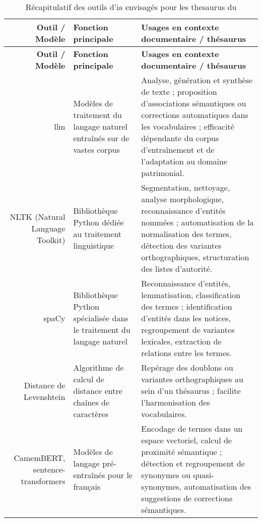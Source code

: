 \begin{longtable}{D E E}
	\caption{Récapitulatif des outils d'\ac{ia} envisagés pour les \gls{thesaurus} du \mae}
	\label{tab:recapIA}\\
	\hline\hline
	\textbf{Outil / Modèle} & \textbf{Fonction principale} & \textbf{Usages en contexte documentaire / thésaurus} \\
	\hline
	\endfirsthead
	
	\hline\hline
	\textbf{Outil / Modèle} & \textbf{Fonction principale} & \textbf{Usages en contexte documentaire / thésaurus} \\
	\hline
	\endhead
	
	\hline
	\endfoot
	
	\hline\hline
	\endlastfoot
	
	\ac{llm} & Modèles de traitement du langage naturel entraînés sur de vastes corpus & Analyse, génération et synthèse de texte ; proposition d’associations sémantiques ou corrections automatiques dans les vocabulaires ; efficacité dépendante du corpus d’entraînement et de l’adaptation au domaine patrimonial. \\
	NLTK (Natural Language Toolkit) & Bibliothèque Python dédiée au traitement linguistique & Segmentation, nettoyage, analyse morphologique, reconnaissance d’entités nommées ; automatisation de la normalisation des termes, détection des variantes orthographiques, structuration des listes d’autorité. \\
	spaCy & Bibliothèque Python spécialisée dans le traitement du langage naturel & Reconnaissance d’entités, lemmatisation, classification des termes ; identification d’entités dans les notices, regroupement de variantes lexicales, extraction de relations entre les termes. \\
	Distance de Levenshtein & Algorithme de calcul de distance entre chaînes de caractères & Repérage des doublons ou variantes orthographiques au sein d’un thésaurus ; facilite l’harmonisation des vocabulaires. \\
	CamemBERT, sentence-transformers & Modèles de langage pré-entraînés pour le français & Encodage de termes dans un espace vectoriel, calcul de proximité sémantique ; détection et regroupement de synonymes ou quasi-synonymes, automatisation des suggestions de corrections sémantiques. \\
\end{longtable}